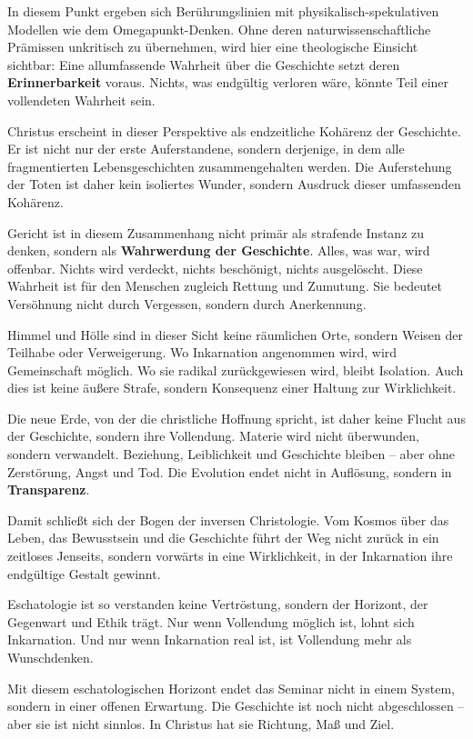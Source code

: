 \documentclass[
]{article}
\begin{document}
In diesem Punkt ergeben sich Berührungslinien mit physikalisch-spekulativen Modellen wie dem Omegapunkt-Denken. Ohne deren naturwissenschaftliche Prämissen unkritisch zu übernehmen, wird hier eine theologische Einsicht sichtbar: Eine allumfassende Wahrheit über die Geschichte setzt deren \textbf{Erinnerbarkeit} voraus. Nichts, was endgültig verloren wäre, könnte Teil einer vollendeten Wahrheit sein.

Christus erscheint in dieser Perspektive als endzeitliche Kohärenz der Geschichte. Er ist nicht nur der erste Auferstandene, sondern derjenige, in dem alle fragmentierten Lebensgeschichten zusammengehalten werden. Die Auferstehung der Toten ist daher kein isoliertes Wunder, sondern Ausdruck dieser umfassenden Kohärenz.

Gericht ist in diesem Zusammenhang nicht primär als strafende Instanz zu denken, sondern als \textbf{Wahrwerdung der Geschichte}. Alles, was war, wird offenbar. Nichts wird verdeckt, nichts beschönigt, nichts ausgelöscht. Diese Wahrheit ist für den Menschen zugleich Rettung und Zumutung. Sie bedeutet Versöhnung nicht durch Vergessen, sondern durch Anerkennung.

Himmel und Hölle sind in dieser Sicht keine räumlichen Orte, sondern Weisen der Teilhabe oder Verweigerung. Wo Inkarnation angenommen wird, wird Gemeinschaft möglich. Wo sie radikal zurückgewiesen wird, bleibt Isolation. Auch dies ist keine äußere Strafe, sondern Konsequenz einer Haltung zur Wirklichkeit.

Die neue Erde, von der die christliche Hoffnung spricht, ist daher keine Flucht aus der Geschichte, sondern ihre Vollendung. Materie wird nicht überwunden, sondern verwandelt. Beziehung, Leiblichkeit und Geschichte bleiben -- aber ohne Zerstörung, Angst und Tod. Die Evolution endet nicht in Auflösung, sondern in \textbf{Transparenz}.

Damit schließt sich der Bogen der inversen Christologie. Vom Kosmos über das Leben, das Bewusstsein und die Geschichte führt der Weg nicht zurück in ein zeitloses Jenseits, sondern vorwärts in eine Wirklichkeit, in der Inkarnation ihre endgültige Gestalt gewinnt.

Eschatologie ist so verstanden keine Vertröstung, sondern der Horizont, der Gegenwart und Ethik trägt. Nur wenn Vollendung möglich ist, lohnt sich Inkarnation. Und nur wenn Inkarnation real ist, ist Vollendung mehr als Wunschdenken.

Mit diesem eschatologischen Horizont endet das Seminar nicht in einem System, sondern in einer offenen Erwartung. Die Geschichte ist noch nicht abgeschlossen -- aber sie ist nicht sinnlos. In Christus hat sie Richtung, Maß und Ziel.
\end{document}
